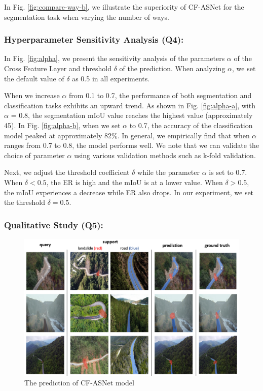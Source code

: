\documentclass{ieeeaccess}
\begin{document}
In Fig. \ref{fig:compare-way-b}, we illustrate the superiority of CF-ASNet for the segmentation task when varying the number of ways. 

\subsubsection{Hyperparameter Sensitivity Analysis (Q4):}

 In Fig. \ref{fig:alpha}, we present the  sensitivity analysis of the parameters $\alpha$ of the Cross Feature Layer and threshold  $\delta$ of the prediction. When analyzing $\alpha$, we set the default value of $\delta$ as 0.5 in all experiments. 
 
 When we increase $\alpha$ from 0.1 to 0.7,  the performance of both segmentation and classification tasks exhibits an upward trend. As shown in Fig. \ref{fig:alpha-a}, with $\alpha$ = 0.8, the segmentation mIoU value reaches the highest value (approximately 45). In Fig. \ref{fig:alpha-b}, when we set $\alpha$ to 0.7, the accuracy of the classification model peaked at approximately 82\%. In general, we empirically find that when $\alpha$ ranges from 0.7 to 0.8, the model performs well. We note that we can validate the choice of parameter $\alpha$ using various validation methods such as k-fold validation.

Next, we adjust the threshold coefficient $\delta$ while the parameter $\alpha$ is set to 0.7. When $\delta< 0.5$, the ER is high and the mIoU is at a lower value. When  $\delta > 0.5$, the mIoU experiences a decrease while ER also drops. In our experiment, we set the threshold $\delta=0.5$.

\subsubsection{Qualitative Study (Q5):}

    \begin{figure}[t]
        \centering
        \includegraphics[width=\textwidth]{Fig/quali_study.png}
        \caption{The prediction of CF-ASNet model}
        \label{fig:demo}
    \end{figure}
\end{document}
